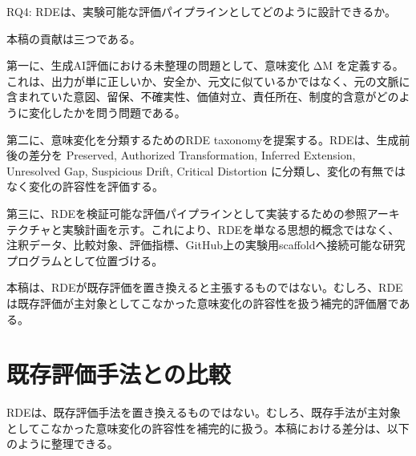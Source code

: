 \documentclass[
  a4paper]{ltjsarticle}
\begin{document}
RQ4: RDEは、実験可能な評価パイプラインとしてどのように設計できるか。

本稿の貢献は三つである。

第一に、生成AI評価における未整理の問題として、意味変化 ΔM
を定義する。これは、出力が単に正しいか、安全か、元文に似ているかではなく、元の文脈に含まれていた意図、留保、不確実性、価値対立、責任所在、制度的含意がどのように変化したかを問う問題である。

第二に、意味変化を分類するためのRDE
taxonomyを提案する。RDEは、生成前後の差分を Preserved, Authorized
Transformation, Inferred Extension, Unresolved Gap, Suspicious Drift,
Critical Distortion に分類し、変化の有無ではなく変化の許容性を評価する。

第三に、RDEを検証可能な評価パイプラインとして実装するための参照アーキテクチャと実験計画を示す。これにより、RDEを単なる思想的概念ではなく、注釈データ、比較対象、評価指標、GitHub上の実験用scaffoldへ接続可能な研究プログラムとして位置づける。

本稿は、RDEが既存評価を置き換えると主張するものではない。むしろ、RDEは既存評価が主対象としてこなかった意味変化の許容性を扱う補完的評価層である。

\section{既存評価手法との比較}\label{comparison-with-existing-evaluation-methods}

RDEは、既存評価手法を置き換えるものではない。むしろ、既存手法が主対象としてこなかった意味変化の許容性を補完的に扱う。本稿における差分は、以下のように整理できる。
\end{document}
